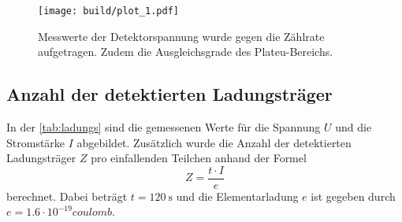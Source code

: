 \begin{figure}[H]
	\texttt{[image: build/plot\_1.pdf]}
	\caption{Messwerte der Detektorspannung wurde gegen die Zählrate aufgetragen. Zudem die Ausgleichsgrade des Plateu-Bereichs.}
	\label{fig:plot_1}
\end{figure}

\subsection{Anzahl der detektierten Ladungsträger}
\label{sec:Anzahl der detektierten Ladungsträger}

In der \autoref{tab:ladungs} sind die gemessenen Werte für die  Spannung $U$ und die Stromstärke $I$ abgebildet.
Zusätzlich wurde die Anzahl der detektierten Ladungsträger $Z$ pro einfallenden Teilchen anhand der Formel
\begin{equation*}
    Z = \frac{t \cdot I}{e}
\end{equation*}
berechnet. Dabei beträgt $t = \SI{120}{\second}$ und die Elementarladung $e$ ist gegeben durch $e = 1.6 \cdot 10^{-19} \si{coulomb}$.

